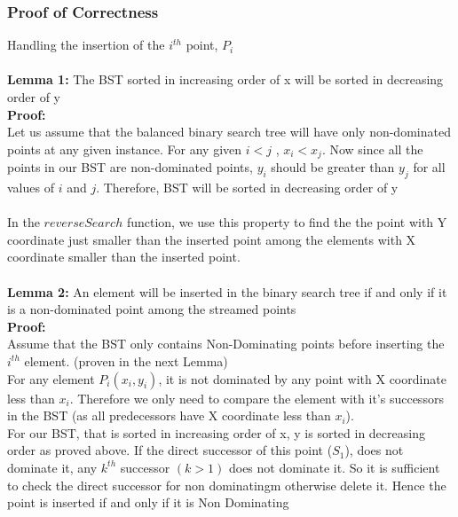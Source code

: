 \documentclass{article}
\begin{document}
            \subsubsection*{Proof of Correctness}
                Handling the insertion of the $i^{th}$ point, $P_i$
                \\
                \\
                \textbf{Lemma 1:} The BST sorted in increasing order of x will be sorted in decreasing order of y
                \\
                \textbf{Proof:}
                \\
                Let us assume that the balanced binary search tree will have only non-dominated points at any given instance. For any given $i < j$ , $x_i < x_j$. Now since all the points in our BST are non-dominated points, $y_i$ should be greater than $y_j$ for all values of $i$ and $j$. Therefore, BST will be sorted in decreasing order of y
                \\
                \\
                In the $reverseSearch$ function, we use this property to find the the point with Y coordinate just smaller than the inserted point among the elements with X coordinate smaller than the inserted point.
                \\
                \\
                \textbf{Lemma 2:} An element will be inserted in the binary search tree if and only if it is a non-dominated point among the streamed points
                \\
                \textbf{Proof:}
                \\
                Assume that the BST only contains Non-Dominating points before inserting the $i^{th}$ element. (proven in the next Lemma)
                \\
                For any element $P_i(x_i, y_i)$, it is not dominated by any point with X coordinate less than $x_i$. Therefore we only need to compare the element with it's successors in the BST (as all predecessors have X coordinate less than $x_i$).
                \\
                For our BST, that is sorted in increasing order of x, y is sorted in decreasing order as proved above. If the direct successor of this point ($S_1$),  does not dominate it, any $k^{th}$ successor $(k > 1)$ does not dominate it. So it is sufficient to check the direct successor for non dominatingm otherwise delete it. Hence the point is inserted if and only if it is Non Dominating
\end{document}
